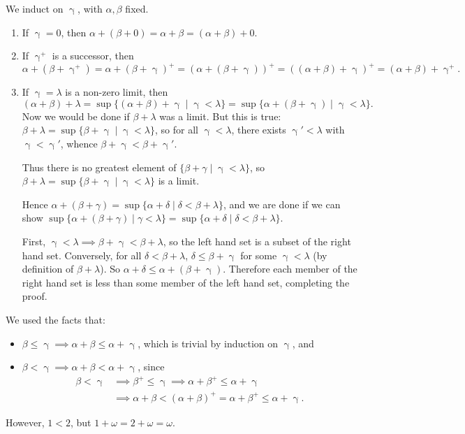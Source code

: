 \documentclass[12pt]{article}
\begin{document}
\begin{proofbox}
	We induct on $\upgamma$, with $\alpha, \beta$ fixed.
	\begin{enumerate}
		\item If $\upgamma = 0$, then $\alpha + (\beta + 0) = \alpha + \beta = (\alpha + \beta) + 0$.
		\item If $\upgamma^{+}$ is a successor, then
			\[
			\alpha + (\beta + \upgamma^{+}) = \alpha + (\beta + \upgamma)^{+} = (\alpha + (\beta + \upgamma))^{+} = ((\alpha + \beta) + \upgamma)^{+} = (\alpha + \beta) + \upgamma^{+}
			.\]
		\item If $\upgamma = \lambda$ is a non-zero limit, then
			\[
				(\alpha + \beta) + \lambda = \sup\{(\alpha + \beta) + \upgamma \mid \upgamma < \lambda\} = \sup\{ \alpha + (\beta + \upgamma) \mid \upgamma < \lambda\}
			.\]
			Now we would be done if $\beta + \lambda$ was a limit. But this is true: $\beta + \lambda = \sup\{\beta + \upgamma \mid \upgamma < \lambda\}$, so for all $\upgamma < \lambda$, there exists $\upgamma' < \lambda$ with $\upgamma < \upgamma'$, whence $\beta + \upgamma < \beta + \upgamma'$.

			Thus there is no greatest element of $\{\beta + \gamma \mid \upgamma < \lambda\}$, so $\beta + \lambda = \sup\{\beta + \upgamma \mid \upgamma < \lambda\}$ is a limit.

			Hence $\alpha + (\beta + \gamma) = \sup \{\alpha + \delta \mid \delta < \beta + \lambda\}$, and we are done if we can show $\sup \{ \alpha + (\beta + \gamma)\mid \gamma < \lambda\} = \sup\{\alpha + \delta \mid \delta < \beta + \lambda\}$.

			First, $\upgamma < \lambda \implies \beta + \upgamma < \beta + \lambda$, so the left hand set is a subset of the right hand set. Conversely, for all $\delta < \beta + \lambda$, $\delta \leq \beta + \upgamma$ for some $\upgamma < \lambda$ (by definition of $\beta + \lambda$). So $\alpha + \delta \leq \alpha + (\beta + \upgamma)$. Therefore each member of the right hand set is less than some member of the left hand set, completing the proof.
	\end{enumerate}
\end{proofbox}

\begin{remark}
	We used the facts that:
	\begin{itemize}
		\item $\beta \leq \upgamma \implies \alpha + \beta \leq \alpha + \upgamma$, which is trivial by induction on $\upgamma$, and
		\item $\beta < \upgamma \implies \alpha + \beta < \alpha + \upgamma$, since
			\begin{align*}
				\beta < \upgamma &\implies \beta^{+} \leq \upgamma \implies \alpha + \beta^{+} \leq \alpha + \upgamma \\
						 &\implies \alpha + \beta < (\alpha + \beta)^{+} = \alpha + \beta^{+} \leq \alpha + \upgamma.
			\end{align*}
	\end{itemize}
	However, $1 < 2$, but $1 + \omega = 2 + \omega = \omega$.
\end{remark}
\end{document}
